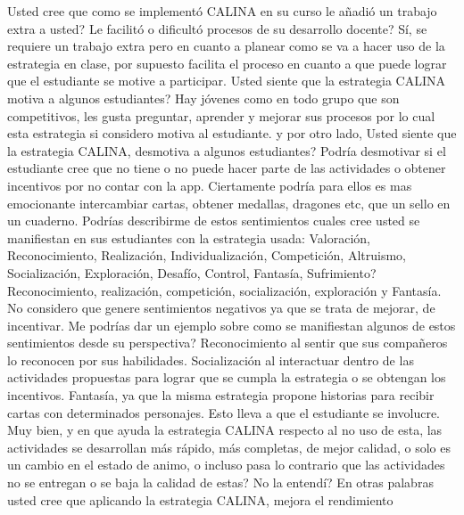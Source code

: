 \begin{dialogue}
	 Usted cree que como se implementó CALINA en su curso le añadió un trabajo extra a 
	usted? Le facilitó o dificultó procesos de su desarrollo docente?
	 Sí, se requiere un trabajo extra pero en cuanto a planear como se va a hacer 
	uso de la estrategia en clase, por supuesto facilita el proceso en cuanto a que puede lograr que el 
	estudiante se motive a participar.
	 Usted siente que la estrategia CALINA motiva a algunos estudiantes?
	 Hay jóvenes como en todo grupo que son competitivos, les gusta preguntar, 
	aprender y mejorar sus procesos por lo cual esta estrategia si considero motiva al estudiante.
	 y por otro lado, Usted siente que la estrategia CALINA, desmotiva a algunos 
	estudiantes?
	 Podría desmotivar si el estudiante cree que no tiene o no puede  hacer parte 
	de las actividades o obtener incentivos por no contar con la app. Ciertamente podría  para ellos es 
	mas emocionante intercambiar cartas, obtener medallas, dragones etc, que un sello en un cuaderno.
	 Podrías describirme de estos sentimientos cuales cree usted se manifiestan en sus 
	estudiantes con la estrategia usada: Valoración, Reconocimiento, Realización, Individualización, 
	Competición, Altruismo, Socialización, Exploración, Desafío, Control, Fantasía, Sufrimiento?
	 Reconocimiento, realización, competición, socialización, exploración y 
	Fantasía. No considero que genere sentimientos negativos ya que se trata de mejorar, de incentivar.
	 Me podrías dar un ejemplo sobre como se manifiestan algunos de estos sentimientos 
	desde su perspectiva?
	 Reconocimiento al sentir que sus compañeros  lo reconocen por sus 
	habilidades. Socialización al interactuar dentro de las actividades propuestas para lograr que se 
	cumpla la estrategia o se obtengan los incentivos.
	 Fantasía, ya que la misma estrategia propone historias para recibir cartas 
	con determinados personajes. Esto lleva a que el estudiante se involucre.
	 Muy bien, y en que ayuda la estrategia CALINA respecto al no uso de esta, las 
	actividades se desarrollan más rápido, más completas, de mejor calidad, o solo es un cambio en el 
	estado de animo, o incluso pasa lo contrario que las actividades no se entregan o se baja la calidad 
	de estas?
	 No la entendí?
	 En otras palabras usted cree que aplicando la estrategia CALINA, mejora el rendimiento 

\end{dialogue}
